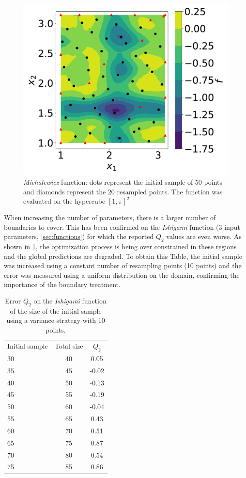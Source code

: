 \begin{figure}[h]
\centering
\includegraphics[width=\linewidth,keepaspectratio]{fig/contributions/resample/3_1column_color-online-only_response_Michalewicz_sigma.pdf}
\caption{\textit{Michalewicz} function: dots represent the initial sample of 50 points and diamonds represent the 20 resampled points. The function was evaluated on the hypercube $[1, \pi]^2$}
\label{fig:rs-michalewicz}
\end{figure}

When increasing the number of parameters, there is a larger number of boundaries to cover. This has been confirmed on the \textit{Ishigami} function (3 input parameters, \cref{sec:functions}) for which the reported $Q_2$ values are even worse. As shown in \cref{tab:size-q2-ishigami}, the optimization process is being over constrained in these regions and the global predictions are degraded. To obtain this Table, the initial sample was increased using a constant number of resampling points (10 points) and the error was measured using a uniform distribution on the domain, confirming the importance of the boundary treatment.

\begin{table}[h]
\centering
\begin{tabular}{lcc}
\toprule
Initial sample&Total size & $Q_2$ \\
\cmidrule{1-3}
30 & 40 & 0.05  \\
35 & 45 & -0.02 \\
40 & 50 & -0.13 \\
45 & 55 & -0.19 \\
50 & 60 & -0.04 \\
55 & 65 & 0.43  \\
60 & 70 & 0.51  \\
65 & 75 & 0.87  \\
70 & 80 & 0.54  \\
75 & 85 & 0.86  \\
\bottomrule
\end{tabular}
\caption{Error $Q_2$ on the \textit{Ishigami} function of the size of the initial sample using a variance strategy with 10 points.}
\label{tab:size-q2-ishigami}
\end{table}

